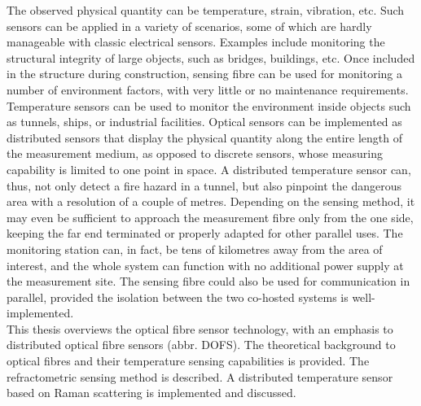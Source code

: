 \documentclass{standalone}
\begin{document}
The observed physical quantity can be temperature, strain, vibration, etc. Such sensors can be applied in a variety of scenarios, some of which are hardly manageable with classic electrical sensors. Examples include monitoring the structural integrity of large objects, such as bridges, buildings, etc. Once included in the structure during construction, sensing fibre can be used for monitoring a number of environment factors, with very little or no maintenance requirements. Temperature sensors can be used to monitor the environment inside objects such as tunnels, ships, or industrial facilities. Optical sensors can be implemented as distributed sensors that display the physical quantity along the entire length of the measurement medium, as opposed to discrete sensors, whose measuring capability is limited to one point in space. A distributed temperature sensor can, thus, not only detect a fire hazard in a tunnel, but also pinpoint the dangerous area with a resolution of a couple of metres. Depending on the sensing method, it may even be sufficient to approach the measurement fibre only from the one side, keeping the far end terminated or properly adapted for other parallel uses. The monitoring station can, in fact, be tens of kilometres away from the area of interest, and the whole system can function with no additional power supply at the measurement site. The sensing fibre could also be used for communication in parallel, provided the isolation between the two co-hosted systems is well-implemented. \\

This thesis overviews the optical fibre sensor technology, with an emphasis to distributed optical fibre sensors (abbr. DOFS). The theoretical background to optical fibres and their temperature sensing capabilities is provided. The refractometric sensing method is described. A distributed temperature sensor based on Raman scattering is implemented and discussed. 


\setcounter{stranica}{\thepage}
\addtocounter{stranica}{1}
\end{document}
